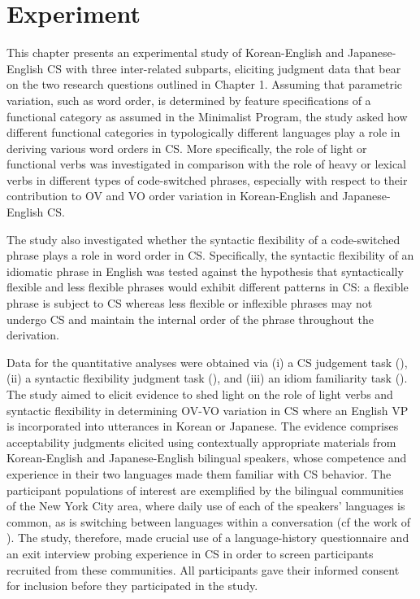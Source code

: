 \chapter{Experiment}\label{ch:2}

This chapter presents an experimental study of Korean-English and Japanese-English \ac{CS} with three inter-related subparts, eliciting judgment data that bear on the two research questions outlined in Chapter 1. Assuming that parametric variation, such as word order, is determined by feature specifications of a functional category as assumed in the Minimalist Program, the study asked how different functional categories in typologically different languages play a role in deriving various word orders in \ac{CS}. More specifically, the role of light or functional verbs was investigated in comparison with the role of heavy or lexical verbs in different types of code-switched phrases, especially with respect to their contribution to \ac{OV} and \ac{VO} order variation in Korean-English and Japanese-English \ac{CS}. 

The study also investigated whether the syntactic flexibility of a code-switched phrase plays a role in word order in \ac{CS}. Specifically, the syntactic flexibility of an idiomatic phrase in English was tested against the hypothesis that syntactically flexible and less flexible phrases would exhibit different patterns in \ac{CS}: a flexible phrase is subject to \ac{CS} whereas less flexible or inflexible phrases may not undergo \ac{CS} and maintain the internal order of the phrase throughout the derivation. 

Data for the quantitative analyses were obtained via (i) a \ac{CS} judgement task (), (ii) a syntactic flexibility judgment task (), and (iii) an idiom familiarity task (). The study aimed to elicit evidence to shed light on the role of light verbs and syntactic flexibility in determining \ac{OV}-\ac{VO} variation in \ac{CS} where an English \ac{VP} is incorporated into utterances in Korean or Japanese. The evidence comprises acceptability judgments elicited using contextually appropriate materials from Korean-English and Japanese-English bilingual speakers, whose competence and experience in their two languages made them familiar with \ac{CS} behavior. The participant populations of interest are exemplified by the bilingual communities of the New York City area, where daily use of each of the speakers’ languages is common, as is switching between languages within a conversation (cf the work of \citealt{Chung2012}). The study, therefore, made crucial use of a language-history questionnaire and an exit interview probing experience in \ac{CS} in order to screen participants recruited from these communities. All participants gave their informed consent for inclusion before they participated in the study. 

